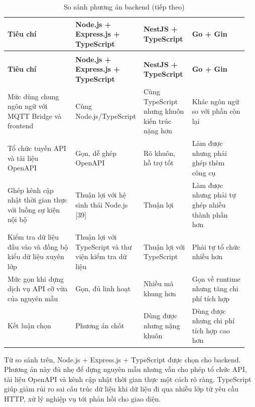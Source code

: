 \documentclass[a4paper]{extarticle}
\newcommand{\thesissettableid}[2]{%
  \renewcommand{\thetable}{#1}%
  \renewcommand{\theHtable}{#2}%
}
\begin{document}
{\thesissettableid{3.34}{condensed-bang-3-34-so-sanh-phuong-an-backend}
\def\LTcaptype{table}
\begin{longtable}{|L{0.28\linewidth}|L{0.238\linewidth}|L{0.203\linewidth}|L{0.23\linewidth}|}
\caption{So sánh phương án backend}\label{tab:condensed-bang-3-34-so-sanh-phuong-an-backend}\\
\hline
\textbf{Tiêu chí} & \textbf{Node.js + Express.js + TypeScript} & \textbf{NestJS + TypeScript} & \textbf{Go + Gin} \\
\hline
\endfirsthead
\caption[]{So sánh phương án backend (tiếp theo)}\\
\hline
\textbf{Tiêu chí} & \textbf{Node.js + Express.js + TypeScript} & \textbf{NestJS + TypeScript} & \textbf{Go + Gin} \\
\hline
\endhead
\endfoot
\endlastfoot
Mức dùng chung ngôn ngữ với MQTT Bridge và frontend & Cùng Node.js/TypeScript & Cùng TypeScript nhưng khuôn kiến trúc nặng hơn & Khác ngôn ngữ so với phần còn lại \\\hline
Tổ chức tuyến API và tài liệu OpenAPI & Gọn, dễ ghép OpenAPI & Rõ khuôn, hỗ trợ tốt & Làm được nhưng phải ghép thêm công cụ \\\hline
Ghép kênh cập nhật thời gian thực với luồng sự kiện nội bộ & Thuận lợi với hệ sinh thái Node.js {[}39{]} & Thuận lợi & Làm được nhưng phải tự ghép nhiều thành phần hơn \\\hline
Kiểm tra dữ liệu đầu vào và đồng bộ kiểu dữ liệu xuyên lớp & Thuận lợi với TypeScript và thư viện kiểm tra dữ liệu & Thuận lợi với TypeScript & Phải tự tổ chức nhiều hơn \\\hline
Mức gọn khi dựng dịch vụ API cỡ vừa của nguyên mẫu & Gọn, đủ linh hoạt & Nhiều mã khung hơn & Gọn về runtime nhưng tăng chi phí tích hợp \\\hline
Kết luận chọn & Phương án chốt & Dùng được nhưng nặng khuôn & Dùng được nhưng chi phí tích hợp cao hơn \\\hline
\end{longtable}
}

Từ so sánh trên, Node.js + Express.js + TypeScript được chọn cho backend.
Phương án này đủ nhẹ để dựng nguyên mẫu nhưng vẫn cho phép tổ chức API, tài
liệu OpenAPI và kênh cập nhật thời gian thực một cách rõ ràng. TypeScript giúp
giảm rủi ro sai cấu trúc dữ liệu khi dữ liệu đi qua nhiều lớp từ yêu cầu HTTP,
xử lý nghiệp vụ tới phản hồi cho giao diện.
\end{document}
